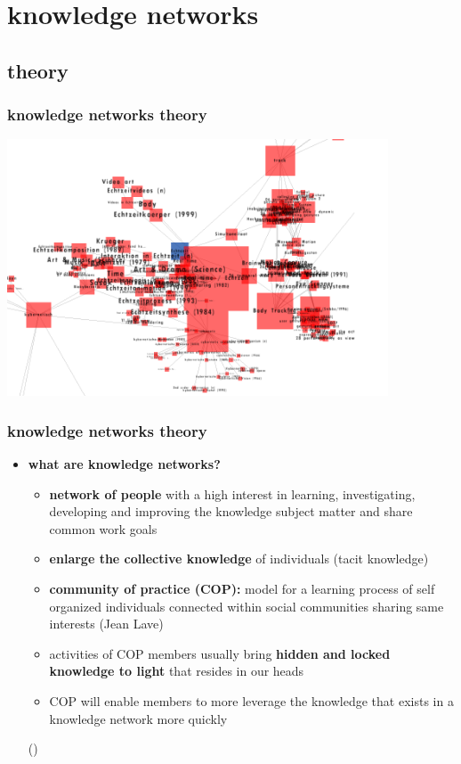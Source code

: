 \documentclass[blue]{beamer}
\begin{document}

\section{knowledge networks}
\subsection{theory}
\frame
{
\frametitle{\textbf{knowledge networks theory}}
\includegraphics[width=0.85\textwidth]{bin/semaspace/semaspace.png}
}

\frame
{
\frametitle{\textbf{knowledge networks theory}}
\begin{itemize}
	\item \textbf{what are knowledge networks?}
	\begin{itemize}
		\item \textbf{network of people} with a high interest in learning, investigating, developing and improving the knowledge subject matter and share common work goals
		\item \textbf{enlarge the collective knowledge} of individuals (tacit knowledge)
		\item \textbf{community of practice (COP):} model for a learning process of self organized individuals connected within social communities sharing same interests (Jean Lave)
		\item activities of COP members usually bring \textbf{hidden and locked knowledge to light} that resides in our heads
		\item COP will enable members to more leverage the knowledge that exists in a knowledge network more quickly
	\end{itemize}
	()
\end{itemize}
}
\end{document}

